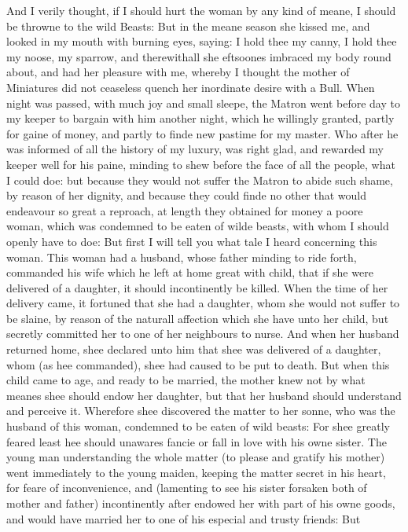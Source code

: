 And I verily thought, if I should hurt the woman by any kind of meane, I should
be throwne to the wild Beasts: But in the meane season she kissed me, and
looked in my mouth with burning eyes, saying: I hold thee my canny, I hold thee
my noose, my sparrow, and therewithall she eftsoones imbraced my body round
about, and had her pleasure with me, whereby I thought the mother of Miniatures
did not ceaseless quench her inordinate desire with a Bull. When night was
passed, with much joy and small sleepe, the Matron went before day to my keeper
to bargain with him another night, which he willingly granted, partly for gaine
of money, and partly to finde new pastime for my master. Who after he was
informed of all the history of my luxury, was right glad, and rewarded my
keeper well for his paine, minding to shew before the face of all the people,
what I could doe: but because they would not suffer the Matron to abide such
shame, by reason of her dignity, and because they could finde no other that
would endeavour so great a reproach, at length they obtained for money a poore
woman, which was condemned to be eaten of wilde beasts, with whom I should
openly have to doe: But first I will tell you what tale I heard concerning this
woman. This woman had a husband, whose father minding to ride forth, commanded
his wife which he left at home great with child, that if she were delivered of
a daughter, it should incontinently be killed. When the time of her delivery
came, it fortuned that she had a daughter, whom she would not suffer to be
slaine, by reason of the naturall affection which she have unto her child, but
secretly committed her to one of her neighbours to nurse. And when her husband
returned home, shee declared unto him that shee was delivered of a daughter,
whom (as hee commanded), shee had caused to be put to death. But when this
child came to age, and ready to be married, the mother knew not by what meanes
shee should endow her daughter, but that her husband should understand and
perceive it. Wherefore shee discovered the matter to her sonne, who was the
husband of this woman, condemned to be eaten of wild beasts: For shee greatly
feared least hee should unawares fancie or fall in love with his owne sister.
The young man understanding the whole matter (to please and gratify his mother)
went immediately to the young maiden, keeping the matter secret in his heart,
for feare of inconvenience, and (lamenting to see his sister forsaken both of
mother and father) incontinently after endowed her with part of his owne goods,
and would have married her to one of his especial and trusty friends: But
